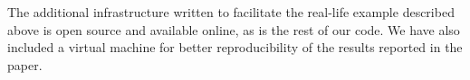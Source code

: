 \begin{authors}
The additional infrastructure written to facilitate the real-life example
described above is open source and available online, as is the rest of our code.
We have also included a virtual machine for better reproducibility of the
results reported in the paper.

\begin{actions}
  \vspace{2em}

\end{actions}
\end{authors}
